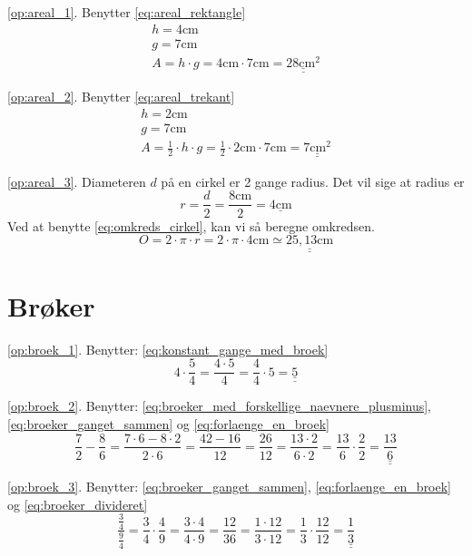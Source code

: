 \documentclass[11pt,a5paper,fleqn,leqno]{book}
\begin{document}
\ref{op:areal_1}. Benytter \eqref{eq:areal_rektangle}
\begin{displaymath}\begin{array}{l}
h = 4\text{cm}\\
g = 7\text{cm}\\
A = h \cdot g = 4\text{cm} \cdot 7\text{cm} = \underline{\underline{28\text{cm}^2}}
\end{array}\end{displaymath}

\ref{op:areal_2}. Benytter \eqref{eq:areal_trekant}
\begin{displaymath}\begin{array}{l}
h = 2\text{cm}\\
g = 7\text{cm}\\
A = \frac{1}{2} \cdot h \cdot g = \frac{1}{2} \cdot 2\text{cm} \cdot 7\text{cm} = \underline{\underline{7\text{cm}^2}}
\end{array}\end{displaymath}

\ref{op:areal_3}. Diameteren $d$ på en cirkel er 2 gange radius. Det vil sige at radius er
\[r = \frac{d}{2} = \frac{8\text{cm}}{2} = \underline{4\text{cm}}\]
Ved at benytte \eqref{eq:omkreds_cirkel}, kan vi så beregne omkredsen.
\[O = 2 \cdot \pi \cdot r = 2 \cdot \pi \cdot 4\text{cm} \simeq \underline{\underline{25,13\text{cm}}}\]

\section{Brøker}

\ref{op:broek_1}. Benytter: \eqref{eq:konstant_gange_med_broek}
\[4 \cdot \frac{5}{4} = \frac{4 \cdot 5}{4} = \frac{4}{4} \cdot 5 = \underline{\underline{5}}\]

\ref{op:broek_2}. Benytter: \eqref{eq:broeker_med_forskellige_naevnere_plusminus}, \eqref{eq:broeker_ganget_sammen} og \eqref{eq:forlaenge_en_broek}
\[\frac{7}{2} - \frac{8}{6} = \frac{7 \cdot 6 - 8 \cdot 2}{2 \cdot 6} = \frac{42 - 16}{12} = \frac{26}{12} = \frac{13 \cdot 2}{6 \cdot 2} = \frac{13}{6} \cdot \frac{2}{2} = \underline{\underline{\frac{13}{6}}}\]

\ref{op:broek_3}. Benytter: \eqref{eq:broeker_ganget_sammen}, \eqref{eq:forlaenge_en_broek} og \eqref{eq:broeker_divideret}
\[\frac{\frac{3}{4}}{\frac{9}{4}} = \frac{3}{4} \cdot \frac{4}{9} = \frac{3 \cdot 4}{4 \cdot 9} = \frac{12}{36} = \frac{1 \cdot 12}{3 \cdot 12} = \frac{1}{3} \cdot \frac{12}{12} = \underline{\underline{\frac{1}{3}}}\]
\end{document}
